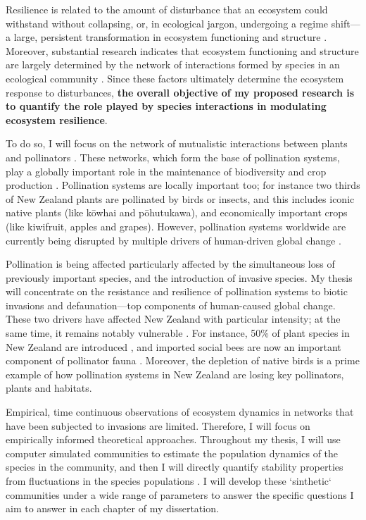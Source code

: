 \documentclass[a4paper]{article}
\begin{document}
Resilience is related to the amount of disturbance that an ecosystem could withstand without collapsing, or, in ecological jargon, undergoing a regime shift---a large, persistent transformation in ecosystem functioning and structure \autocite{Holling1973, Gunderson2000}.
Moreover, substantial research indicates that ecosystem functioning and structure are largely determined by the network of interactions formed by species in an ecological community \autocite{Bascompte2006, Dobson2006, Tylianakis2008, Reiss2009}.
Since these factors ultimately determine the ecosystem response to disturbances, \textbf{the overall objective of my proposed research is to quantify the role played by species interactions in modulating ecosystem resilience}.

To do so, I will focus on the network of mutualistic interactions between plants and pollinators \autocite{Bascompte2006, Bascompte2007, Klein2007}.
These networks, which form the base of pollination systems, play a globally important role in the maintenance of biodiversity and crop production \autocite{Bascompte2007, Klein2007}.
Pollination systems are locally important too; for instance two thirds of New Zealand plants are pollinated by birds or insects\autocite{Cox2000}, and this includes iconic native plants (like k\={o}whai and p\={o}hutukawa), and economically important crops (like kiwifruit, apples and grapes). However, pollination systems worldwide are currently being disrupted by multiple drivers of human-driven global change \autocite{Cox2000}.

Pollination is being affected particularly affected by the simultaneous loss of previously important species, and the introduction of invasive species.
My thesis will concentrate on the resistance and resilience of pollination systems to biotic invasions and defaunation---top components of human-caused global change.
These two drivers have affected New Zealand with particular intensity; at the same time, it remains notably vulnerable \autocite{Vitousek1997}.
For instance, 50\% of plant species in New Zealand are introduced \autocite{Wilton2000}, and imported social bees are now an important component of pollinator fauna \autocite{Lloyd1985, Newstrom2005}.
Moreover, the depletion of native birds \autocite{Anderson2003, Robertson2009} is a prime example of how pollination systems in New Zealand are losing key pollinators, plants and habitats\autocite{Cox2000}.

Empirical, time continuous observations of ecosystem dynamics in networks that have been subjected to invasions are limited.
Therefore, I will focus on empirically informed theoretical approaches.
Throughout my thesis, I will use computer simulated communities to estimate the population dynamics of the species in the community, and then I will directly quantify stability properties from fluctuations in the species populations \autocite{Bastolla2009, Garcia-Algarra2013}.
I will develop these `sinthetic` communities under a wide range of parameters to answer the specific questions I aim to answer in each chapter of my dissertation.
\end{document}

